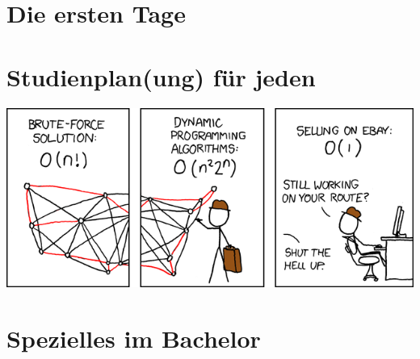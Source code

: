 \documentclass[
]{papertex}
\begin{document}
	\thispagestyle{empty}
	\clearpage

	\listoftodos
	\clearpage

	\setcounter{page}{1}
	\tableofcontents
	
	\newpage

	\section{Die ersten Tage}
		
		
	\newpage

	\section{Studienplan(ung) für jeden}
		\label{studienplan}
		\begin{multicols}{2}
		
		\end{multicols}

		\vfill
		\begin{center}
			\includegraphics[width=\textwidth]{bilder/XKCD/travelling_salesman}
		\end{center}
		\vfill
	\newpage

	\section{Spezielles im Bachelor}
		\label{bachelor}
		\begin{multicols}{2}
		
		
		
		\end{multicols}
		
\end{document}
